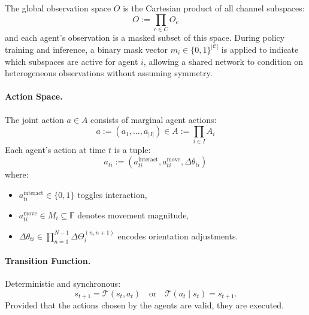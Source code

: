 \documentclass{article}
\begin{document}
The global observation space \(O\) is the Cartesian product of all channel subspaces:
\[
    O := \prod_{c \in {C}} O_c
\]
and each agent's observation is a masked subset of this space.
During policy training and inference, a binary mask vector \(m_i \in \{0,1\}^{|\mathcal{C}|}\) 
is applied to indicate which subspaces are active for agent \(i\), 
allowing a shared network to condition on heterogeneous observations without assuming symmetry.


\paragraph{Action Space.} 
The joint action \(a \in A\) consists of marginal agent actions:
\[
    a := (a_1, \ldots, a_{|I|}) \in A := \prod_{i \in I} A_i
\]
Each agent's action at time \(t\) is a tuple:
\[
    a_{ti} := (a_{ti}^\text{interact}, a_{ti}^\text{move}, \Delta\theta_{ti})
\]
where:
\begin{itemize}
    \item \(a_{ti}^\text{interact} \in \{0,1\}\) toggles interaction,
    \item \(a_{ti}^\text{move} \in M_i \subseteq \mathbb{F}\) denotes movement magnitude,
    \item \(\Delta\theta_{ti} \in \prod_{n=1}^{N-1} \Delta\Theta_i^{(n,n+1)}\) encodes orientation adjustments.
\end{itemize}


\paragraph{Transition Function.} 
Deterministic and synchronous:
\[
    s_{t+1} = \mathcal{T}(s_t, a_t) \quad \text{or} \quad \mathcal{T}(a_t \mid s_t) = s_{t+1}.
\]
Provided that the actions chosen by the agents are valid, they are executed.
\end{document}
